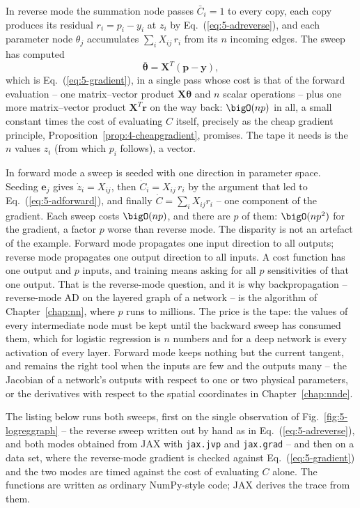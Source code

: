 In reverse mode the summation node passes $\bar C_i=1$ to every copy, each
copy produces its residual $r_i=p_i-y_i$ at $z_i$ by
Eq.~(\ref{eq:5-adreverse}), and each parameter node $\theta_j$ accumulates
$\sum_i X_{ij}\,r_i$ from its $n$ incoming edges.  The sweep has computed
\begin{equation}
  \bar{\bm{\theta}} = \bm{X}^{T}(\bm{p}-\bm{y}) ,
  \label{eq:5-adgradient}
\end{equation}
which is Eq.~(\ref{eq:5-gradient}), in a single pass whose cost is that of
the forward evaluation -- one matrix--vector product $\bm{X}\bm{\theta}$
and $n$ scalar operations -- plus one more matrix--vector product
$\bm{X}^{T}\bm{r}$ on the way back: $\bigO(np)$ in all, a small constant
times the cost of evaluating $C$ itself, precisely as the cheap gradient
principle, Proposition~\ref{prop:4-cheapgradient}, promises.  The tape it
needs is the $n$ values $z_i$ (from which $p_i$ follows), a vector.

In forward mode a sweep is seeded with one direction in parameter space.
Seeding $\bm{e}_j$ gives $\dot z_i=X_{ij}$, then
$\dot C_i=X_{ij}\,r_i$ by the argument that led to
Eq.~(\ref{eq:5-adforward}), and finally $\dot C=\sum_iX_{ij}r_i$ -- one
component of the gradient.  Each sweep costs $\bigO(np)$, and there are
$p$ of them: $\bigO(np^{2})$ for the gradient, a factor $p$ worse than
reverse mode.  The disparity is not an artefact of the example.  Forward
mode propagates one input direction to all outputs; reverse mode
propagates one output direction to all inputs.  A cost function has one
output and $p$ inputs, and training means asking for all $p$ sensitivities
of that one output.  That is the reverse-mode question, and it is why
backpropagation -- reverse-mode AD on the layered graph of a network -- is
the algorithm of Chapter~\ref{chap:nn}, where $p$ runs to millions.  The
price is the tape: the values of every intermediate node must be kept
until the backward sweep has consumed them, which for logistic regression
is $n$ numbers and for a deep network is every activation of every layer.
Forward mode keeps nothing but the current tangent, and remains the right
tool when the inputs are few and the outputs many -- the Jacobian of a
network's outputs with respect to one or two physical parameters, or the
derivatives with respect to the spatial coordinates in
Chapter~\ref{chap:nnde}.

The listing below runs both sweeps, first on the single observation of
Fig.~\ref{fig:5-logreggraph} -- the reverse sweep written out by hand as
in Eq.~(\ref{eq:5-adreverse}), and both modes obtained from JAX with
\texttt{jax.jvp} and \texttt{jax.grad} -- and then on a data set, where the
reverse-mode gradient is checked against Eq.~(\ref{eq:5-gradient}) and the
two modes are timed against the cost of evaluating $C$ alone.  The
functions are written as ordinary NumPy-style code; JAX derives the trace
from them.

